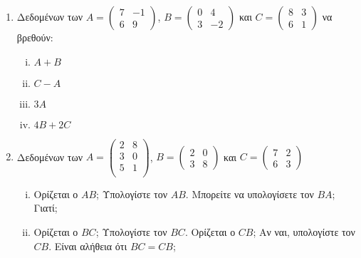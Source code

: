 \documentclass[a4paper,12pt]{article}
\begin{document}
\thispagestyle{empty}

\begin{center}
\end{center}

\vspace{\baselineskip}


\begin{enumerate}


\item Δεδομένων των $A=\begin{pmatrix}
7 & -1 \\
6 & 9
\end{pmatrix}$,
$B=\begin{pmatrix}
0 & 4 \\
3 & -2 
\end{pmatrix}$
και $C=\begin{pmatrix}
8 & 3 \\
6 & 1 
\end{pmatrix}$ να βρεθούν:

\begin{enumerate}[i)]
\item $A+B$
\item $C-A$
\item $3A$
\item $4B+2C$
\end{enumerate}

\item Δεδομένων των $A=\begin{pmatrix}
2 & 8 \\
3 & 0 \\
5 & 1 \\
\end{pmatrix}$, $B=\begin{pmatrix}
2 & 0 \\
3 & 8 
\end{pmatrix}$ και $C=\begin{pmatrix}
7 &  2 \\
6 & 3 
\end{pmatrix}$ 

\begin{enumerate}[i)]
\item Ορίζεται ο $AB$; Υπολογίστε τον $AB$. Μπορείτε να υπολογίσετε τον $BA$; Γιατί;

\item Ορίζεται ο $BC$; Υπολογίστε τον $BC$. Ορίζεται ο $CB$; Αν ναι, υπολογίστε τον $CB$. Είναι αλήθεια ότι $BC=CB$;
\end{enumerate}









\end{enumerate}
\end{document}
